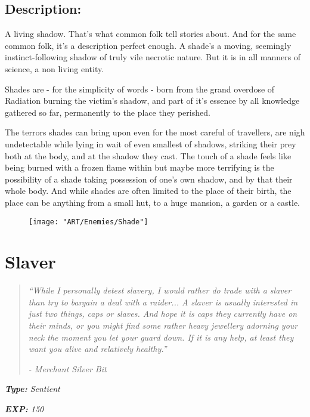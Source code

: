 \documentclass[11pt,a4paper,twocolumn]{book}
\begin{document}
	\subsection*{Description:}
	A living shadow. That's what common folk tell stories about. And for the same common folk, it's a description perfect enough. A shade's a moving, seemingly instinct-following shadow of truly vile necrotic nature. But it is in all manners of science, a non living entity.
	
	Shades are - for the simplicity of words - born from the grand overdose of Radiation burning the victim's shadow, and part of it's essence by all knowledge gathered so far, permanently to the place they perished. 
	
	The terrors shades can bring upon even for the most careful of travellers, are nigh undetectable while lying in wait of even smallest of shadows, striking their prey both at the body, and at the shadow they cast. The touch of a shade feels like being burned with a frozen flame within but maybe more terrifying is the possibility of a shade taking possession of one's own shadow, and by that their whole body. And while shades are often limited to the place of their birth, the place can be anything from a small hut, to a huge mansion, a garden or a castle.
	
	\begin{figure}[h]
		\centering
		\texttt{[image: "ART/Enemies/Shade"]}
	\end{figure}
	
	\clearpage
	
	\section*{Slaver}
	\begin{quote}
		\emph{``While I personally detest slavery, I would rather do trade with a slaver than try to bargain a deal with a raider... A slaver is usually interested in just two things, caps or slaves. And hope it is caps they currently have on their minds, or you might find some rather heavy jewellery adorning your neck the moment you let your guard down. If it is any help, at least they want you alive and relatively healthy.''}
		
		\emph{-	Merchant Silver Bit}
	\end{quote}
	
	\emph{\textbf{Type:} Sentient}
	
	\emph{\textbf{EXP:} 150}
	
\end{document}

